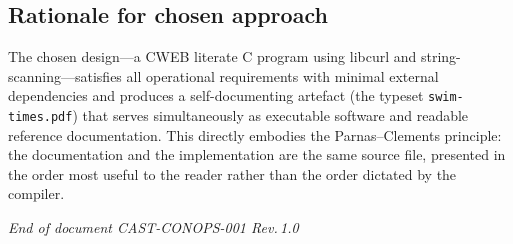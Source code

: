 \documentclass[12pt]{article}
\newcommand{\code}[1]{\texttt{#1}}
\begin{document}
\subsection{Rationale for chosen approach}

The chosen design---a CWEB literate C program using libcurl and
string-scanning---satisfies all operational requirements with
minimal external dependencies and produces a self-documenting
artefact (the typeset \code{swim-times.pdf}) that serves
simultaneously as executable software and readable reference
documentation.  This directly embodies the Parnas--Clements
principle: the documentation and the implementation are the
same source file, presented in the order most useful to the
reader rather than the order dictated by the compiler.

\vfill
\begin{center}
  \small\textit{End of document CAST-CONOPS-001 Rev.\,1.0}
\end{center}
\end{document}
